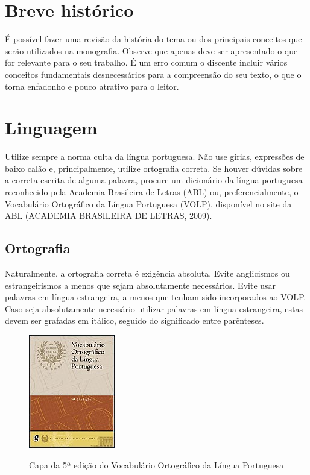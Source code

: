 \section{Breve histórico}
É possível fazer uma revisão da história do tema ou dos principais conceitos que serão utilizados na monografia. Observe que apenas deve ser apresentado o que for relevante para o seu trabalho. É um erro comum o discente incluir vários conceitos fundamentais desnecessários para a compreensão do seu texto, o que o torna enfadonho e pouco atrativo para o leitor.

\section{Linguagem}
Utilize sempre a norma culta da língua portuguesa. Não use gírias, expressões de baixo calão e, principalmente, utilize ortografia correta. Se houver dúvidas sobre a correta escrita de alguma palavra, procure um dicionário da língua portuguesa reconhecido pela Academia Brasileira de Letras (ABL) ou, preferencialmente, o Vocabulário Ortográfico da Língua Portuguesa (VOLP), disponível no site da ABL (ACADEMIA BRASILEIRA DE LETRAS, 2009).

\subsection{Ortografia}
Naturalmente, a ortografia correta é exigência absoluta. Evite anglicismos ou estrangeirismos a menos que sejam absolutamente necessários. Evite usar palavras em língua estrangeira, a menos que tenham sido incorporados ao VOLP. Caso seja absolutamente necessário utilizar palavras em língua estrangeira, estas devem ser grafadas em itálico, seguido do significado entre parênteses.


\begin{figure}[H]%
	\centering
 	  \caption{Capa da 5ª edição do Vocabulário Ortográfico da Língua Portuguesa}
		\includegraphics{imagens/capavolp.png}
	\label{fig:capavolp}
\end{figure}

